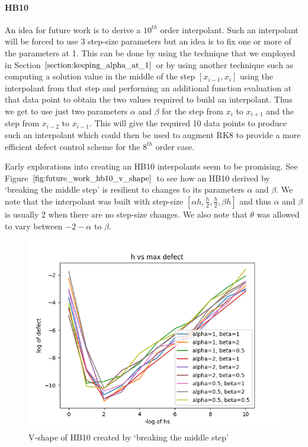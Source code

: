 \documentclass{report}
\begin{document}
\paragraph{HB10}
An idea for future work is to derive a $10^{th}$ order interpolant. Such an interpolant will be forced to use 3 step-size parameters but an idea is to fix one or more of the parameters at 1. This can be done by using the technique that we employed in Section $\ref{section:keeping_alpha_at_1}$ or by using another technique such as computing a solution value in the middle of the step $[x_{i-1}, x_i]$ using the interpolant from that step and performing an additional function evaluation at that data point to obtain the two values required to build an interpolant. Thus we get to use just two parameters $\alpha$ and $\beta$ for the step from $x_i$ to $x_{i+1}$ and the step from $x_{i-2}$ to $x_{i-1}$.  This will give the required 10 data points to produce such an interpolant which could then be used to augment RK8 to provide a more efficient defect control scheme for the $8^{th}$ order case. 

Early explorations into creating an HB10 interpolants seem to be promising. See Figure $\ref{fig:future_work_hb10_v_shape}$ to see how an HB10 derived by `breaking the middle step' is resilient to changes to its parameters $\alpha$ and $\beta$. We note that the interpolant was built with step-size $[\alpha h, \frac{h}{2}, \frac{h}{2}, \beta h]$ and thus $\alpha$ and $\beta$ is usually 2 when there are no step-size changes. We also note that $\theta$ was allowed to vary between $-2-\alpha$ to $\beta$.

\begin{figure}[H]
\centering
\includegraphics[width=0.7\linewidth]{./figures/future_work_hb10_v_shape}
\caption{V-shape of HB10 created by `breaking the middle step'}
\label{fig:future_work_hb10_v_shape}
\end{figure}
\end{document}
